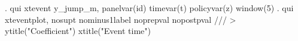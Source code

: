 . qui xtevent y_jump_m, panelvar(id) timevar(t) policyvar(z) window(5) 
{\smallskip}
. qui xteventplot, nosupt nominus1label noprepval nopostpval ///
>         ytitle("Coefficient") xtitle("Event time")
{\smallskip}
